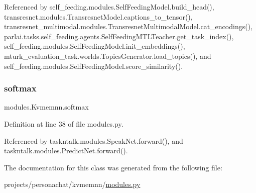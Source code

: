 Referenced by self\+\_\+feeding.\+modules.\+Self\+Feeding\+Model.\+build\+\_\+head(), transresnet.\+modules.\+Transresnet\+Model.\+captions\+\_\+to\+\_\+tensor(), transresnet\+\_\+multimodal.\+modules.\+Transresnet\+Multimodal\+Model.\+cat\+\_\+encodings(), parlai.\+tasks.\+self\+\_\+feeding.\+agents.\+Self\+Feeding\+M\+T\+L\+Teacher.\+get\+\_\+task\+\_\+index(), self\+\_\+feeding.\+modules.\+Self\+Feeding\+Model.\+init\+\_\+embeddings(), mturk\+\_\+evaluation\+\_\+task.\+worlds.\+Topics\+Generator.\+load\+\_\+topics(), and self\+\_\+feeding.\+modules.\+Self\+Feeding\+Model.\+score\+\_\+similarity().

\mbox{\label{classmodules_1_1Kvmemnn_a0e6f77ae3ba405fa58d6515f48324395}} 
\subsubsection{\texorpdfstring{softmax}{softmax}}
{\footnotesize\ttfamily modules.\+Kvmemnn.\+softmax}



Definition at line 38 of file modules.\+py.



Referenced by taskntalk.\+modules.\+Speak\+Net.\+forward(), and taskntalk.\+modules.\+Predict\+Net.\+forward().



The documentation for this class was generated from the following file\+:\begin{DoxyCompactItemize}
\item 
projects/personachat/kvmemnn/\hyperlink{projects_2personachat_2kvmemnn_2modules_8py}{modules.\+py}\end{DoxyCompactItemize}

